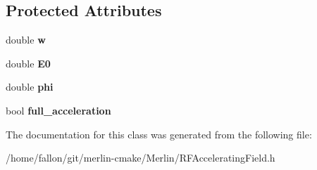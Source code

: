 \subsection*{Protected Attributes}
\begin{DoxyCompactItemize}
\item 
\mbox{\label{classRFAcceleratingField_ad9e2768bf6e1bb5aa1e1b00fad8ce5cc}} 
double {\bfseries w}
\item 
\mbox{\label{classRFAcceleratingField_af0f5c16f96b2933f6a7d2b46cf7506c0}} 
double {\bfseries E0}
\item 
\mbox{\label{classRFAcceleratingField_a7a0b6f75ae800e4ff29cfc447afb3105}} 
double {\bfseries phi}
\item 
\mbox{\label{classRFAcceleratingField_a2501566f666e3193c4473384a8662f35}} 
bool {\bfseries full\+\_\+acceleration}
\end{DoxyCompactItemize}


The documentation for this class was generated from the following file\+:\begin{DoxyCompactItemize}
\item 
/home/fallon/git/merlin-\/cmake/\+Merlin/R\+F\+Accelerating\+Field.\+h\end{DoxyCompactItemize}
